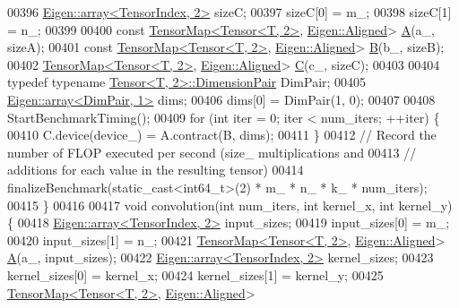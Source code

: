 \begin{DoxyCode}
00396     \hyperlink{class_eigen_1_1array}{Eigen::array<TensorIndex, 2>} sizeC;
00397     sizeC[0] = m\_;
00398     sizeC[1] = n\_;
00399 
00400     \textcolor{keyword}{const} \hyperlink{class_eigen_1_1_tensor_map}{TensorMap<Tensor<T, 2>}, \hyperlink{group__enums_gga45fe06e29902b7a2773de05ba27b47a1ad37d4c71425bb286e9b4103830538fbf}{Eigen::Aligned}> 
      \hyperlink{group___core___module_class_eigen_1_1_matrix}{A}(a\_, sizeA);
00401     \textcolor{keyword}{const} \hyperlink{class_eigen_1_1_tensor_map}{TensorMap<Tensor<T, 2>}, \hyperlink{group__enums_gga45fe06e29902b7a2773de05ba27b47a1ad37d4c71425bb286e9b4103830538fbf}{Eigen::Aligned}> 
      \hyperlink{group___core___module_class_eigen_1_1_matrix}{B}(b\_, sizeB);
00402     \hyperlink{class_eigen_1_1_tensor_map}{TensorMap<Tensor<T, 2>}, \hyperlink{group__enums_gga45fe06e29902b7a2773de05ba27b47a1ad37d4c71425bb286e9b4103830538fbf}{Eigen::Aligned}> 
      \hyperlink{group___core___module}{C}(c\_, sizeC);
00403 
00404     \textcolor{keyword}{typedef} \textcolor{keyword}{typename} \hyperlink{class_eigen_1_1_tensor}{Tensor<T, 2>::DimensionPair} DimPair;
00405     \hyperlink{class_eigen_1_1array}{Eigen::array<DimPair, 1>} dims;
00406     dims[0] = DimPair(1, 0);
00407 
00408     StartBenchmarkTiming();
00409     \textcolor{keywordflow}{for} (\textcolor{keywordtype}{int} iter = 0; iter < num\_iters; ++iter) \{
00410       C.device(device\_) = A.contract(B, dims);
00411     \}
00412     \textcolor{comment}{// Record the number of FLOP executed per second (size\_ multiplications and}
00413     \textcolor{comment}{// additions for each value in the resulting tensor)}
00414     finalizeBenchmark(static\_cast<int64\_t>(2) * m\_ * n\_ * k\_ * num\_iters);
00415   \}
00416 
00417   \textcolor{keywordtype}{void} convolution(\textcolor{keywordtype}{int} num\_iters, \textcolor{keywordtype}{int} kernel\_x, \textcolor{keywordtype}{int} kernel\_y) \{
00418     \hyperlink{class_eigen_1_1array}{Eigen::array<TensorIndex, 2>} input\_sizes;
00419     input\_sizes[0] = m\_;
00420     input\_sizes[1] = n\_;
00421     \hyperlink{class_eigen_1_1_tensor_map}{TensorMap<Tensor<T, 2>}, \hyperlink{group__enums_gga45fe06e29902b7a2773de05ba27b47a1ad37d4c71425bb286e9b4103830538fbf}{Eigen::Aligned}> 
      \hyperlink{group___core___module_class_eigen_1_1_matrix}{A}(a\_, input\_sizes);
00422     \hyperlink{class_eigen_1_1array}{Eigen::array<TensorIndex, 2>} kernel\_sizes;
00423     kernel\_sizes[0] = kernel\_x;
00424     kernel\_sizes[1] = kernel\_y;
00425     \hyperlink{class_eigen_1_1_tensor_map}{TensorMap<Tensor<T, 2>}, \hyperlink{group__enums_gga45fe06e29902b7a2773de05ba27b47a1ad37d4c71425bb286e9b4103830538fbf}{Eigen::Aligned}> 

\end{DoxyCode}
